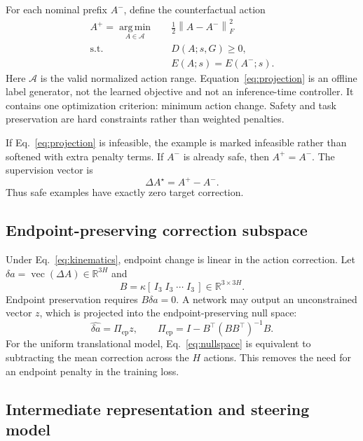 \documentclass[10pt,conference]{IEEEtran}
\newcommand{\R}{\mathbb{R}}
\newcommand{\1}{\mathbf{1}}
\newcommand{\norm}[1]{\left\lVert #1 \right\rVert}
\newcommand{\argmin}{\operatorname*{arg\,min}}
\begin{document}
For each nominal prefix $A^-$, define the counterfactual action
\begin{equation}
\begin{aligned}
A^+ = \argmin_{A\in\mathcal{A}}
&\quad \frac{1}{2}\norm{A-A^-}_F^2\\
\text{s.t.}
&\quad D(A;s,G)\geq 0,\\
&\quad E(A;s)=E(A^-;s).
\end{aligned}
\label{eq:projection}
\end{equation}
Here $\mathcal{A}$ is the valid normalized action range. Equation~\eqref{eq:projection} is an offline label generator, not the learned objective and not an inference-time controller. It contains one optimization criterion: minimum action change. Safety and task preservation are hard constraints rather than weighted penalties.

If Eq.~\eqref{eq:projection} is infeasible, the example is marked infeasible rather than softened with extra penalty terms. If $A^-$ is already safe, then $A^+=A^-$. The supervision vector is
\begin{equation}
    \Delta A^\star=A^+-A^-.
    \label{eq:deltastar}
\end{equation}
Thus safe examples have exactly zero target correction.

\subsection{Endpoint-preserving correction subspace}

Under Eq.~\eqref{eq:kinematics}, endpoint change is linear in the action correction. Let $\delta a=\operatorname{vec}(\Delta A)\in\R^{3H}$ and
\begin{equation}
    B=\kappa[\,I_3\;I_3\;\cdots\;I_3\,]\in\R^{3\times 3H}.
\end{equation}
Endpoint preservation requires $B\delta a=0$. A network may output an unconstrained vector $z$, which is projected into the endpoint-preserving null space:
\begin{equation}
    \widehat{\delta a}
    =\Pi_{\mathrm{ep}}z,
    \qquad
    \Pi_{\mathrm{ep}}
    =I-B^\top(BB^\top)^{-1}B.
    \label{eq:nullspace}
\end{equation}
For the uniform translational model, Eq.~\eqref{eq:nullspace} is equivalent to subtracting the mean correction across the $H$ actions. This removes the need for an endpoint penalty in the training loss.

\subsection{Intermediate representation and steering model}
\end{document}
